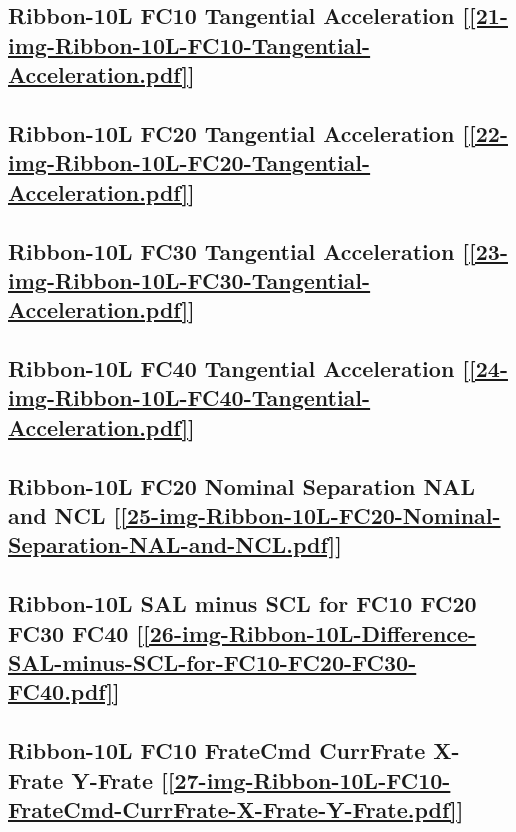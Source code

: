 \subsection       {Ribbon-10L FC10 Tangential Acceleration
	[\ref      {21-img-Ribbon-10L-FC10-Tangential-Acceleration.pdf}] }
\label{ssec-21-img-Ribbon-10L-FC10-Tangential-Acceleration.pdf}

\subsection       {Ribbon-10L FC20 Tangential Acceleration
	[\ref      {22-img-Ribbon-10L-FC20-Tangential-Acceleration.pdf}] }
\label{ssec-22-img-Ribbon-10L-FC20-Tangential-Acceleration.pdf}

\subsection       {Ribbon-10L FC30 Tangential Acceleration
	[\ref      {23-img-Ribbon-10L-FC30-Tangential-Acceleration.pdf}] }
\label{ssec-23-img-Ribbon-10L-FC30-Tangential-Acceleration.pdf}

\subsection       {Ribbon-10L FC40 Tangential Acceleration
	[\ref      {24-img-Ribbon-10L-FC40-Tangential-Acceleration.pdf}] }
\label{ssec-24-img-Ribbon-10L-FC40-Tangential-Acceleration.pdf}

\subsection       {Ribbon-10L FC20 Nominal Separation NAL and NCL
	[\ref      {25-img-Ribbon-10L-FC20-Nominal-Separation-NAL-and-NCL.pdf}] }
\label{ssec-25-img-Ribbon-10L-FC20-Nominal-Separation-NAL-and-NCL.pdf}

\subsection       {Ribbon-10L SAL minus SCL for FC10 FC20 FC30 FC40
	[\ref      {26-img-Ribbon-10L-Difference-SAL-minus-SCL-for-FC10-FC20-FC30-FC40.pdf}] }
\label{ssec-26-img-Ribbon-10L-Difference-SAL-minus-SCL-for-FC10-FC20-FC30-FC40.pdf}


\subsection       {Ribbon-10L FC10 FrateCmd CurrFrate X-Frate Y-Frate
	[\ref      {27-img-Ribbon-10L-FC10-FrateCmd-CurrFrate-X-Frate-Y-Frate.pdf}] }
\label{ssec-27-img-Ribbon-10L-FC10-FrateCmd-CurrFrate-X-Frate-Y-Frate.pdf}

